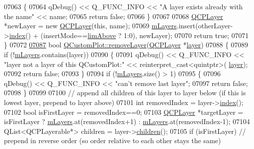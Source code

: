 \begin{DoxyCode}
07063   \{
07064     qDebug() << Q\_FUNC\_INFO << \textcolor{stringliteral}{"A layer exists already with the name"} << name;
07065     \textcolor{keywordflow}{return} \textcolor{keyword}{false};
07066   \}
07067     
07068   \hyperlink{a00043}{QCPLayer} *newLayer = \textcolor{keyword}{new} \hyperlink{a00116_a5dbf96bf7664c1b6fce49063eeea6eef}{QCPLayer}(\textcolor{keyword}{this}, name);
07069   \hyperlink{a00116_ae46b0ffefe1087007ffb11398a18a20e}{mLayers}.insert(otherLayer->\hyperlink{a00043_ad5d7010829a6b99f326b07d7e37c8c99}{index}() + (insertMode==\hyperlink{a00116_acf68ae22e9b44e959fc82bc6366e9b8da065748f172d5a34ffd1e09924d55cc17}{limAbove} ? 1:0), newLayer);
07070   \textcolor{keywordflow}{return} \textcolor{keyword}{true};
07071 \}
07072 
\hypertarget{a00115_source_l07087}{}\hyperlink{a00116_a40f75e342c5eaab6a86066a42a0e2a94}{07087} \textcolor{keywordtype}{bool} \hyperlink{a00116_a40f75e342c5eaab6a86066a42a0e2a94}{QCustomPlot::removeLayer}(\hyperlink{a00043}{QCPLayer} *\hyperlink{a00116_ae576ada60c1133318e29348d43d3cf10}{layer})
07088 \{
07089   \textcolor{keywordflow}{if} (!\hyperlink{a00116_ae46b0ffefe1087007ffb11398a18a20e}{mLayers}.contains(layer))
07090   \{
07091     qDebug() << Q\_FUNC\_INFO << \textcolor{stringliteral}{"layer not a layer of this QCustomPlot:"} << \textcolor{keyword}{reinterpret\_cast<}quintptr\textcolor{keyword}{>}(
      \hyperlink{a00116_ae576ada60c1133318e29348d43d3cf10}{layer});
07092     \textcolor{keywordflow}{return} \textcolor{keyword}{false};
07093   \}
07094   \textcolor{keywordflow}{if} (!\hyperlink{a00116_ae46b0ffefe1087007ffb11398a18a20e}{mLayers}.size() > 1)
07095   \{
07096     qDebug() << Q\_FUNC\_INFO << \textcolor{stringliteral}{"can't remove last layer"};
07097     \textcolor{keywordflow}{return} \textcolor{keyword}{false};
07098   \}
07099   
07100   \textcolor{comment}{// append all children of this layer to layer below (if this is lowest layer, prepend to layer above)}
07101   \textcolor{keywordtype}{int} removedIndex = layer->\hyperlink{a00043_ad5d7010829a6b99f326b07d7e37c8c99}{index}();
07102   \textcolor{keywordtype}{bool} isFirstLayer = removedIndex==0;
07103   \hyperlink{a00043}{QCPLayer} *targetLayer = isFirstLayer ? \hyperlink{a00116_ae46b0ffefe1087007ffb11398a18a20e}{mLayers}.at(removedIndex+1) : 
      \hyperlink{a00116_ae46b0ffefe1087007ffb11398a18a20e}{mLayers}.at(removedIndex-1);
07104   QList<QCPLayerable*> children = layer->\hyperlink{a00043_a94c2f0100e48cefad2de8fe0fbb03c27}{children}();
07105   \textcolor{keywordflow}{if} (isFirstLayer) \textcolor{comment}{// prepend in reverse order (so order relative to each other stays the same)}

\end{DoxyCode}
